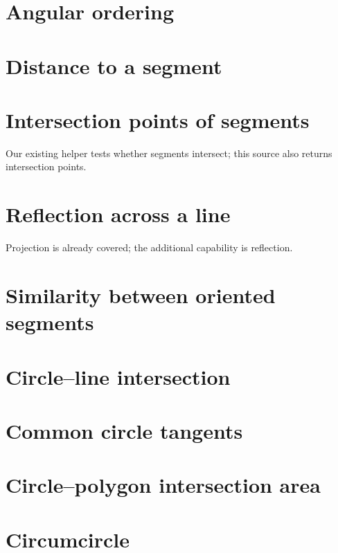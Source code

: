 \section{Angular ordering}

\section{Distance to a segment}

\section{Intersection points of segments}
Our existing helper tests whether segments intersect; this source also returns intersection points.

\section{Reflection across a line}
Projection is already covered; the additional capability is reflection.

\section{Similarity between oriented segments}

\section{Circle--line intersection}

\section{Common circle tangents}

\section{Circle--polygon intersection area}

\section{Circumcircle}

